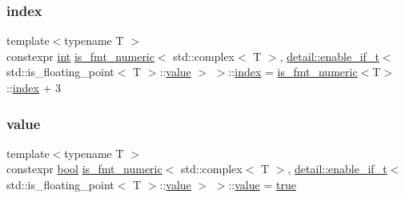\subsubsection{\texorpdfstring{index}{index}}
{\footnotesize\ttfamily template$<$typename T $>$ \\
constexpr \mbox{\hyperlink{warnings_8h_a74f207b5aa4ba51c3a2ad59b219a423b}{int}} \mbox{\hyperlink{structis__fmt__numeric}{is\+\_\+fmt\+\_\+numeric}}$<$ std\+::complex$<$ T $>$, \mbox{\hyperlink{detail_2common_8h_a012819c9e8b5e04872a271f50f8b8196}{detail\+::enable\+\_\+if\+\_\+t}}$<$ std\+::is\+\_\+floating\+\_\+point$<$ T $>$\+::\mbox{\hyperlink{_s_d_l__opengl__glext_8h_a8ad81492d410ff2ac11f754f4042150f}{value}} $>$ $>$\+::\mbox{\hyperlink{_s_d_l__opengl__glext_8h_a57f14e05b1900f16a2da82ade47d0c6d}{index}} = \mbox{\hyperlink{structis__fmt__numeric}{is\+\_\+fmt\+\_\+numeric}}$<$T$>$\+::\mbox{\hyperlink{_s_d_l__opengl__glext_8h_a57f14e05b1900f16a2da82ade47d0c6d}{index}} + 3\hspace{0.3cm}{\ttfamily [static]}}

\mbox{\label{structis__fmt__numeric_3_01std_1_1complex_3_01_t_01_4_00_01detail_1_1enable__if__t_3_01std_1_1is996a96e2979aed124e8880b0fa5542e3_a47c41f5f57683eb0ffed8f94dd7d3692}} 
\subsubsection{\texorpdfstring{value}{value}}
{\footnotesize\ttfamily template$<$typename T $>$ \\
constexpr \mbox{\hyperlink{asdl_8h_af6a258d8f3ee5206d682d799316314b1}{bool}} \mbox{\hyperlink{structis__fmt__numeric}{is\+\_\+fmt\+\_\+numeric}}$<$ std\+::complex$<$ T $>$, \mbox{\hyperlink{detail_2common_8h_a012819c9e8b5e04872a271f50f8b8196}{detail\+::enable\+\_\+if\+\_\+t}}$<$ std\+::is\+\_\+floating\+\_\+point$<$ T $>$\+::\mbox{\hyperlink{_s_d_l__opengl__glext_8h_a8ad81492d410ff2ac11f754f4042150f}{value}} $>$ $>$\+::\mbox{\hyperlink{_s_d_l__opengl__glext_8h_a8ad81492d410ff2ac11f754f4042150f}{value}} = \mbox{\hyperlink{asdl_8h_af6a258d8f3ee5206d682d799316314b1a08f175a5505a10b9ed657defeb050e4b}{true}}\hspace{0.3cm}{\ttfamily [static]}}



